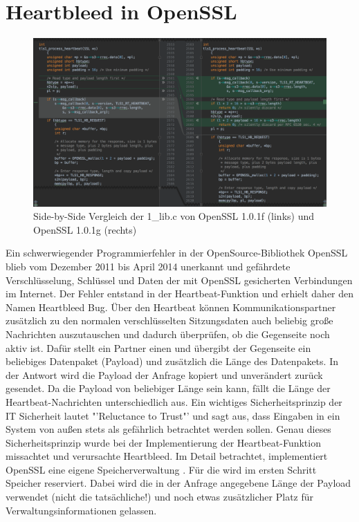 \chapter{Heartbleed in OpenSSL}
%
\begin{figure}[htbp] 
  \centering
  \includegraphics[width=\textwidth]{images/heartbleed/CodeDiffView}
  \caption{Side-by-Side Vergleich der 1\_lib.c von OpenSSL 1.0.1f (links) und OpenSSL 1.0.1g (rechts)}
  \label{fig:Hearthbleed_CodeDiffView}
\end{figure}
%
Ein schwerwiegender Programmierfehler in der OpenSource-Bibliothek OpenSSL blieb vom Dezember 2011 bis April 2014 unerkannt und gefährdete Verschlüsselung, Schlüssel und Daten der mit OpenSSL gesicherten Verbindungen im Internet. Der Fehler entstand in der Heartbeat-Funktion und erhielt daher den Namen Heartbleed Bug. Über den Heartbeat können Kommunikationspartner zusätzlich zu den normalen verschlüsselten Sitzungsdaten auch beliebig große Nachrichten auszutauschen und dadurch überprüfen, ob die Gegenseite noch aktiv ist. Dafür stellt ein Partner einen  und übergibt der Gegenseite ein beliebiges Datenpaket (Payload) und zusätzlich die Länge des Datenpakets. In der Antwort wird die Payload der Anfrage kopiert und unverändert zurück gesendet. Da die Payload von beliebiger Länge sein kann, fällt die Länge der Heartbeat-Nachrichten unterschiedlich aus. 
%
Ein wichtiges Sicherheitsprinzip der IT Sicherheit lautet "'Reluctance to Trust"' und sagt aus, dass Eingaben in ein System von außen stets als gefährlich betrachtet werden sollen. Genau dieses Sicherheitsprinzip wurde bei der Implementierung der Heartbeat-Funktion missachtet und verursachte Heartbleed.
%
Im Detail betrachtet, implementiert OpenSSL eine eigene Speicherverwaltung . Für die  wird im ersten Schritt Speicher reserviert. Dabei wird die in der Anfrage angegebene Länge der Payload verwendet (nicht die tatsächliche!) und noch etwas zusätzlicher Platz für Verwaltungsinformationen gelassen.
